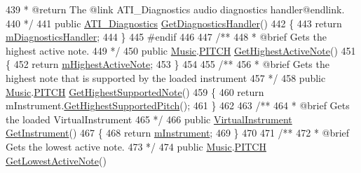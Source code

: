 \begin{DoxyCodeInclude}
439 \textcolor{comment}{        * @return The @link ATI\_Diagnostics audio diagnostics handler@endlink.}
440 \textcolor{comment}{        */}
441         \textcolor{keyword}{public} \hyperlink{group___audio_testing_class_a_t_i___diagnostics}{ATI\_Diagnostics} \hyperlink{group___v_i_m_pub_func_ga7e60bc3c5464d8f34f0d56def675bcc6}{GetDiagnosticsHandler}()
442         \{
443             \textcolor{keywordflow}{return} \hyperlink{group___v_i_m_priv_gafabe4a874fc21f7bcedf431df3b94201}{mDiagnosticsHandler};
444         \}
445 \textcolor{preprocessor}{    #endif}
446 \textcolor{comment}{}
447 \textcolor{comment}{    /**}
448 \textcolor{comment}{     * @brief Gets the highest active note.}
449 \textcolor{comment}{    */}
450     \textcolor{keyword}{public} \hyperlink{class_music}{Music}.\hyperlink{group___music_enums_ga508f69b199ea518f935486c990edac1d}{PITCH} \hyperlink{group___v_i_m_pub_func_gab58eabfbcdaa60a3a7dbd972df6f57a6}{GetHighestActiveNote}()
451     \{
452         \textcolor{keywordflow}{return} \hyperlink{group___v_i_m_priv_ga73a09a4e4f09c0e5b3871dc9ad6c757e}{mHighestActiveNote};
453     \}
454 \textcolor{comment}{}
455 \textcolor{comment}{    /**}
456 \textcolor{comment}{     * @brief Gets the highest note that is supported by the loaded instrument}
457 \textcolor{comment}{    */}
458     \textcolor{keyword}{public} \hyperlink{class_music}{Music}.\hyperlink{group___music_enums_ga508f69b199ea518f935486c990edac1d}{PITCH} \hyperlink{group___v_i_m_pub_func_ga586d5ed5b0fe832d66c9a99aa160ceee}{GetHighestSupportedNote}()
459     \{
460         \textcolor{keywordflow}{return} mInstrument.\hyperlink{group___v_i_base_pub_func_ga859f3e73b1d28051cecf0ecd1c8b10ee}{GetHighestSupportedPitch}();
461     \}
462 \textcolor{comment}{}
463 \textcolor{comment}{    /**}
464 \textcolor{comment}{     * @brief Gets the loaded VirtualInstrument}
465 \textcolor{comment}{    */}
466     \textcolor{keyword}{public} \hyperlink{class_virtual_instrument}{VirtualInstrument} \hyperlink{group___v_i_m_pub_func_gac39a3e411417dc010f0e4fd8f146fbc3}{GetInstrument}()
467     \{
468         \textcolor{keywordflow}{return} \hyperlink{group___v_i_m_priv_gaed435d1f9be09864846db4322dc21fd1}{mInstrument};
469     \}
470 \textcolor{comment}{}
471 \textcolor{comment}{    /**}
472 \textcolor{comment}{     * @brief Gets the lowest active note.}
473 \textcolor{comment}{    */}
474     \textcolor{keyword}{public} \hyperlink{class_music}{Music}.\hyperlink{group___music_enums_ga508f69b199ea518f935486c990edac1d}{PITCH} \hyperlink{group___v_i_m_pub_func_ga09bfbd0756fc8110c877e5b59c104bcd}{GetLowestActiveNote}()

\end{DoxyCodeInclude}

